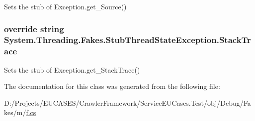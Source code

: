 Sets the stub of Exception.\-get\-\_\-\-Source()

\hypertarget{class_system_1_1_threading_1_1_fakes_1_1_stub_thread_state_exception_a75381e2064a6fe712748ccaec2330e2e}{
\subsubsection[{Stack\-Trace}]{\setlength{\rightskip}{0pt plus 5cm}override string System.\-Threading.\-Fakes.\-Stub\-Thread\-State\-Exception.\-Stack\-Trace\hspace{0.3cm}{\ttfamily [get]}}}\label{class_system_1_1_threading_1_1_fakes_1_1_stub_thread_state_exception_a75381e2064a6fe712748ccaec2330e2e}


Sets the stub of Exception.\-get\-\_\-\-Stack\-Trace()



The documentation for this class was generated from the following file\-:\begin{DoxyCompactItemize}
\item 
D\-:/\-Projects/\-E\-U\-C\-A\-S\-E\-S/\-Crawler\-Framework/\-Service\-E\-U\-Cases.\-Test/obj/\-Debug/\-Fakes/m/\hyperlink{m_2f_8cs}{f.\-cs}\end{DoxyCompactItemize}
